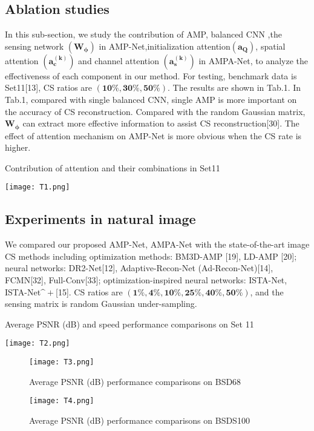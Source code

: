 \documentclass[conference]{IEEEtran}
\begin{document}
\subsection{Ablation studies}
In this sub-section, we study the contribution of AMP, balanced CNN ,the sensing network $\bm{(W_\phi)}$ in AMP-Net,initialization attention$\bm{(a_Q)}$, spatial attention $\bm{(a_c^{(k)})}$ and channel attention $\bm{(a_s^{(k)})}$ in AMPA-Net, to analyze the effectiveness of each component in our method.
For testing, benchmark data is Set11[13], CS ratios are $\bm{(10\%,30\%,50\%)}$. The results are shown in Tab.1. 
In Tab.1, compared with single balanced CNN,  single AMP is more important on the accuracy of CS reconstruction.
Compared with the random Gaussian matrix, $\bm{W_\phi}$  can extract more effective information to assist CS reconstruction[30]. The effect of attention mechanism on AMP-Net is more obvious when the CS rate is higher.
\begin{table}[ht]
\centering
\caption{Contribution of attention and their combinations in Set11}
\texttt{[image: T1.png]}
\label{tab:T1}
\end{table}
\subsection{Experiments in natural image}
We compared our proposed AMP-Net, AMPA-Net with the state-of-the-art image CS methods including optimization methods: BM3D-AMP [19], LD-AMP [20]; neural networks: DR2-Net[12], Adaptive-Recon-Net (Ad-Recon-Net)[14], FCMN[32], Full-Conv[33]; optimization-inspired neural networks: ISTA-Net, ISTA-Net$\bm^{+}$[15].  CS ratios are $\bm{(1\%,4\%,10\% ,25\%,40\%,50\%)}$, and the sensing matrix is random Gaussian under-sampling.
\begin{table}[ht]
\centering
\caption{Average PSNR (dB) and speed performance comparisons on Set 11}
\texttt{[image: T2.png]}
\label{tab:T2}
\end{table}

\begin{figure}[ht]
\centering
\caption{Average PSNR (dB) performance comparisons on BSD68}
\texttt{[image: T3.png]}
\label{tab:T3}
\end{figure}

\begin{figure}[ht]
\centering
\caption{Average PSNR (dB) performance comparisons on BSDS100}
\texttt{[image: T4.png]}
\label{tab:T4}
\end{figure}
\end{document}
